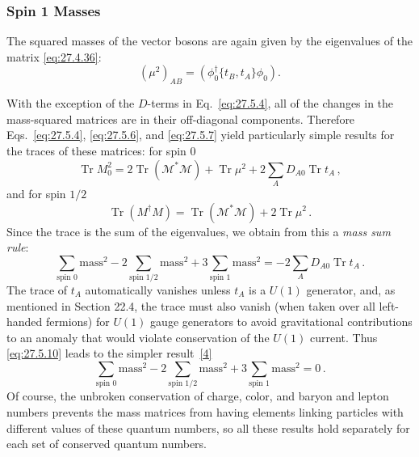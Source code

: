 \subsubsection*{Spin 1 Masses}

The squared masses of the vector bosons are again given by the eigenvalues
of the matrix \eqref{eq:27.4.36}:
\begin{equation}
  (\mu^2)_{AB}
  =\left(\phi_0^\dagger\{t_B,t_A\}\phi_0\right).
  \tag{27.5.7}\label{eq:27.5.7}
\end{equation}

With the exception of the \(D\)-terms in Eq.~\eqref{eq:27.5.4}, all of the
changes in the mass-squared matrices are in their off-diagonal components.
Therefore Eqs.~\eqref{eq:27.5.4}, \eqref{eq:27.5.6}, and
\eqref{eq:27.5.7} yield particularly simple results for the traces of these
matrices: for spin 0
\begin{equation}
  \operatorname{Tr}M_0^2
  =2\operatorname{Tr}(\mathcal{M}^*\mathcal{M})
  +\operatorname{Tr}\mu^2
  +2\sum_A D_{A0}\operatorname{Tr}t_A\,,
  \tag{27.5.8}\label{eq:27.5.8}
\end{equation}
and for spin \(1/2\)
\begin{equation}
  \operatorname{Tr}(M^\dagger M)
  =\operatorname{Tr}(\mathcal{M}^*\mathcal{M})
  +2\operatorname{Tr}\mu^2\,.
  \tag{27.5.9}\label{eq:27.5.9}
\end{equation}
Since the trace is the sum of the eigenvalues, we obtain from this a
\textit{mass sum rule}:
\begin{equation}
  \sum_{\text{spin }0}\mathrm{mass}^2
  -2\sum_{\text{spin }1/2}\mathrm{mass}^2
  +3\sum_{\text{spin }1}\mathrm{mass}^2
  =-2\sum_A D_{A0}\operatorname{Tr}t_A\,.
  \tag{27.5.10}\label{eq:27.5.10}
\end{equation}
The trace of \(t_A\) automatically vanishes unless \(t_A\) is a \(U(1)\)
generator, and, as mentioned in Section 22.4, the trace must also vanish
(when taken over all left-handed fermions) for \(U(1)\) gauge generators to
avoid gravitational contributions to an anomaly that would violate
conservation of the \(U(1)\) current. Thus \eqref{eq:27.5.10} leads to the
simpler result~\hyperref[ch27-ref-4]{[4]}
\begin{equation}
  \sum_{\text{spin }0}\mathrm{mass}^2
  -2\sum_{\text{spin }1/2}\mathrm{mass}^2
  +3\sum_{\text{spin }1}\mathrm{mass}^2
  =0\,.
  \tag{27.5.11}\label{eq:27.5.11}
\end{equation}
Of course, the unbroken conservation of charge, color, and baryon and lepton
numbers prevents the mass matrices from having elements linking particles
with different values of these quantum numbers, so all these results hold
separately for each set of conserved quantum numbers.

